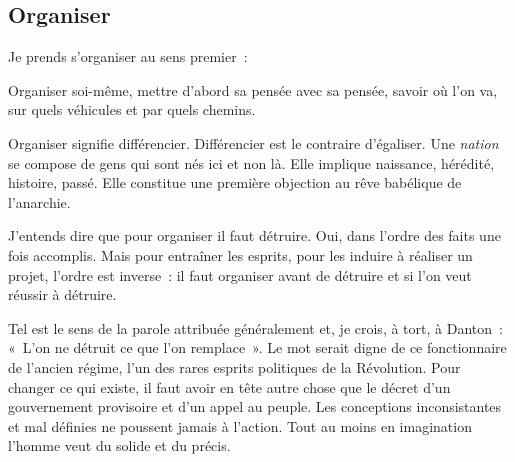 \documentclass[french,twoside]{book} %
\begin{document}
\subsection[{Organiser}]{Organiser}
\noindent Je prends s’organiser au sens premier :\par
Organiser soi-même, mettre d’abord sa pensée avec sa pensée, savoir où l’on va, sur quels véhicules et par quels chemins.\par
Organiser signifie différencier. Différencier est le contraire d’égaliser. Une \emph{nation} se compose de gens qui sont nés ici et non là. Elle implique naissance, hérédité, histoire, passé. Elle constitue une première objection au rêve babélique de l’anarchie.\par
J’entends dire que pour organiser il faut détruire. Oui, dans l’ordre des faits une fois accomplis. Mais pour entraîner les esprits, pour les induire à réaliser un projet, l’ordre est inverse : il faut organiser avant de détruire et si l’on veut réussir à détruire.\par
Tel est le sens de la parole attribuée généralement et, je crois, à tort, à Danton : « L’on ne détruit ce que l’on remplace ». Le mot serait digne de ce fonctionnaire de l’ancien régime, l’un des rares esprits politiques de la Révolution. Pour changer ce qui existe, il faut avoir en tête autre chose que le décret d’un gouvernement provisoire et d’un appel au peuple. Les conceptions inconsistantes et mal définies ne poussent jamais à l’action. Tout au moins en imagination l’homme veut du solide et du précis.
\end{document}

